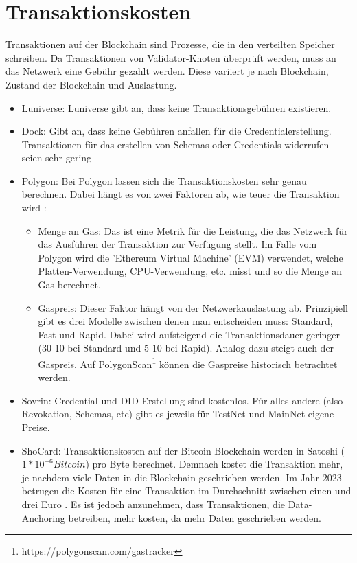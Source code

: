 \section{Transaktionskosten}
Transaktionen auf der Blockchain sind Prozesse, die in den verteilten Speicher schreiben. Da Transaktionen von Validator-Knoten überprüft werden, muss an das Netzwerk eine Gebühr gezahlt werden. Diese variiert je nach Blockchain, Zustand der Blockchain und Auslastung.
\begin{itemize}
	\item Luniverse: Luniverse gibt an, dass keine Transaktionsgebühren existieren.
	\item Dock: Gibt an, dass keine Gebühren anfallen für die Credentialerstellung. Transaktionen für das erstellen von Schemas oder Credentials widerrufen seien sehr gering \cite{ID44}
	\item Polygon: Bei Polygon lassen sich die Transaktionskosten sehr genau berechnen. Dabei hängt es von zwei Faktoren ab, wie teuer die Transaktion wird \cite{ID45}:
	\begin{itemize}
		\item Menge an Gas: Das ist eine Metrik für die Leistung, die das Netzwerk für das Ausführen der Transaktion zur Verfügung stellt. Im Falle vom Polygon wird die 'Ethereum Virtual Machine' (EVM) verwendet, welche Platten-Verwendung, CPU-Verwendung, etc. misst und so die Menge an Gas berechnet.
		\item Gaspreis: Dieser Faktor hängt von der Netzwerkauslastung ab. Prinzipiell gibt es drei Modelle zwischen denen man entscheiden muss: Standard, Fast und Rapid. Dabei wird aufsteigend die Transaktionsdauer geringer (30-10 bei Standard und 5-10 bei Rapid). Analog dazu steigt auch der Gaspreis. Auf PolygonScan\footnote{https://polygonscan.com/gastracker} können die Gaspreise historisch betrachtet werden.
	\end{itemize}
	\item Sovrin: Credential und DID-Erstellung sind kostenlos. Für alles andere (also Revokation, Schemas, etc) gibt es jeweils für TestNet und MainNet eigene Preise.
	\item ShoCard: Transaktionskosten auf der Bitcoin Blockchain werden in Satoshi ($1 * 10^{-6} Bitcoin$) pro Byte berechnet. Demnach kostet die Transaktion mehr, je nachdem viele Daten in die Blockchain geschrieben werden. Im Jahr 2023 betrugen die Kosten für eine Transaktion im Durchschnitt zwischen einen und drei Euro \cite{ID49}. Es ist jedoch anzunehmen, dass Transaktionen, die Data-Anchoring betreiben, mehr kosten, da mehr Daten geschrieben werden.
	
\end{itemize}